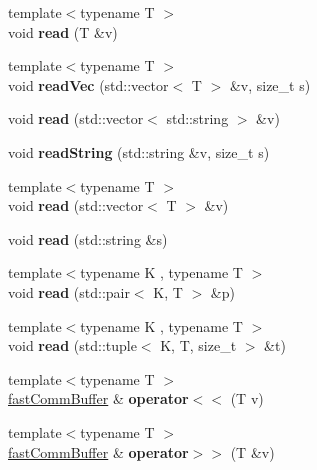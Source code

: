 \begin{DoxyCompactItemize}
\item 
\hypertarget{classfaster_1_1fastCommBuffer_a69122ec66b22498052126f359c5bd6f4}{}\label{classfaster_1_1fastCommBuffer_a69122ec66b22498052126f359c5bd6f4} 
{\footnotesize template$<$typename T $>$ }\\void {\bfseries read} (T \&v)
\item 
\hypertarget{classfaster_1_1fastCommBuffer_a216070c6f8d5070154a50f40b7896add}{}\label{classfaster_1_1fastCommBuffer_a216070c6f8d5070154a50f40b7896add} 
{\footnotesize template$<$typename T $>$ }\\void {\bfseries read\+Vec} (std\+::vector$<$ T $>$ \&v, size\+\_\+t s)
\item 
\hypertarget{classfaster_1_1fastCommBuffer_a757962624ac8bcc0d6a880ccb7bb03db}{}\label{classfaster_1_1fastCommBuffer_a757962624ac8bcc0d6a880ccb7bb03db} 
void {\bfseries read} (std\+::vector$<$ std\+::string $>$ \&v)
\item 
\hypertarget{classfaster_1_1fastCommBuffer_a41bb4e65b2fb070761be378ce2b3601a}{}\label{classfaster_1_1fastCommBuffer_a41bb4e65b2fb070761be378ce2b3601a} 
void {\bfseries read\+String} (std\+::string \&v, size\+\_\+t s)
\item 
\hypertarget{classfaster_1_1fastCommBuffer_a95cf508e01224680a336c5f20e24ae4a}{}\label{classfaster_1_1fastCommBuffer_a95cf508e01224680a336c5f20e24ae4a} 
{\footnotesize template$<$typename T $>$ }\\void {\bfseries read} (std\+::vector$<$ T $>$ \&v)
\item 
\hypertarget{classfaster_1_1fastCommBuffer_aacf66de0fb075c3a588d86a266c7bb8e}{}\label{classfaster_1_1fastCommBuffer_aacf66de0fb075c3a588d86a266c7bb8e} 
void {\bfseries read} (std\+::string \&s)
\item 
\hypertarget{classfaster_1_1fastCommBuffer_aa53c0eac8725e8a0ea773bd027b7be32}{}\label{classfaster_1_1fastCommBuffer_aa53c0eac8725e8a0ea773bd027b7be32} 
{\footnotesize template$<$typename K , typename T $>$ }\\void {\bfseries read} (std\+::pair$<$ K, T $>$ \&p)
\item 
\hypertarget{classfaster_1_1fastCommBuffer_afe0968b6a32dbafdd87639262e21ea0f}{}\label{classfaster_1_1fastCommBuffer_afe0968b6a32dbafdd87639262e21ea0f} 
{\footnotesize template$<$typename K , typename T $>$ }\\void {\bfseries read} (std\+::tuple$<$ K, T, size\+\_\+t $>$ \&t)
\item 
\hypertarget{classfaster_1_1fastCommBuffer_a0b4e973082ad897d135a5a454a06623f}{}\label{classfaster_1_1fastCommBuffer_a0b4e973082ad897d135a5a454a06623f} 
{\footnotesize template$<$typename T $>$ }\\\hyperlink{classfaster_1_1fastCommBuffer}{fast\+Comm\+Buffer} \& {\bfseries operator$<$$<$} (T v)
\item 
\hypertarget{classfaster_1_1fastCommBuffer_a957e261de1a95762b9730a0322f5d341}{}\label{classfaster_1_1fastCommBuffer_a957e261de1a95762b9730a0322f5d341} 
{\footnotesize template$<$typename T $>$ }\\\hyperlink{classfaster_1_1fastCommBuffer}{fast\+Comm\+Buffer} \& {\bfseries operator$>$$>$} (T \&v)
\end{DoxyCompactItemize}


